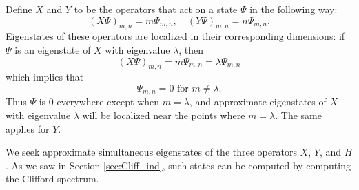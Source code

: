 \documentclass[a4paper]{article}
\begin{document}
Define $X$ and $Y$ to be the operators that act on a state $\Psi$ in the following way:
\begin{equation}\label{eq:xy}
(X \Psi)_{m,n} = m\Psi_{m,n}, \quad (Y \Psi)_{m,n} = n\Psi_{m,n}.
\end{equation}
Eigenstates of these operators are localized in their corresponding dimensions: if $\Psi$ is an eigenstate of $X$ with eigenvalue $\lambda$, then
\begin{equation}
(X \Psi)_{m,n} = m\Psi_{m,n} = \lambda\Psi_{m,n}
\end{equation}
which implies that
\begin{equation}
\Psi_{m,n} = 0 \text{ for } m \neq \lambda.
\end{equation}
Thus $\Psi$ is 0 everywhere except when $m = \lambda$, and approximate eigenstates of $X$ with eigenvalue $\lambda$ will be localized near the points where $m = \lambda$.
The same applies for $Y$.

We seek approximate simultaneous eigenstates of the three operators $X$, $Y$, and $H$. As we saw in Section \ref{sec:Cliff_ind}, such states can be computed by computing the Clifford spectrum.
\end{document}
